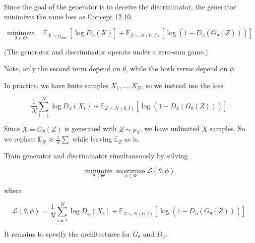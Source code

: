 \begin{concept}
    Since the goal of the generator is to deceive the discriminator, the generator minimizes the same loss as \hyperref[concept:12.10]{Concept 12.10}.

    $$
    \underset{\theta \in \Theta}{\operatorname{minimize}} \quad \mathbb{E}_{X \sim p_{\text {true }}}\left[\log D_{\phi}(X)\right]+\mathbb{E}_{Z \sim \mathcal{N}(0, I)}\left[\log \left(1-D_{\phi}\left(G_{\theta}(Z)\right)\right)\right]
    $$

    (The generator and discriminator operate under a zero-sum game.)

    Note, only the second term depend on $\theta$, while the both terms depend on $\phi$.
\end{concept}

\begin{concept}
    In practice, we have finite samples $X_{1}, \ldots, X_{N}$, so we instead use the loss

    $$
    \frac{1}{N} \sum_{i=1}^{N} \log D_{\phi}\left(X_{i}\right)+\mathbb{E}_{Z \sim \mathcal{N}(0, I)}\left[\log \left(1-D_{\phi}\left(G_{\theta}(Z)\right)\right)\right]
    $$

    Since $\tilde{X}=G_{\theta}(Z)$ is generated with $Z \sim p_{Z}$, we have unlimited $\tilde{X}$ samples. So we replace $\mathbb{E}_{X} \approx \frac{1}{N} \sum$ while leaving $\mathbb{E}_{Z}$ as is.
\end{concept}

\begin{definition}
    Train generator and discriminator simultaneously by solving

    $$
    \underset{\theta \in \Theta}{\operatorname{minimize}} \underset{\phi \in \Phi}{\operatorname{maximize}} \mathcal{L}(\theta, \phi)
    $$

    where

    $$
    \mathcal{L}(\theta, \phi)=\frac{1}{N} \sum_{i=1}^{N} \log D_{\phi}\left(X_{i}\right)+\mathbb{E}_{Z \sim \mathcal{N}(0, I)}\left[\log \left(1-D_{\phi}\left(G_{\theta}(Z)\right)\right)\right]
    $$

    It remains to specify the architectures for $G_{\theta}$ and $D_{\phi}$.
\end{definition}

